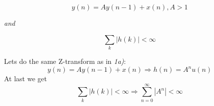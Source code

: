 \documentclass{article}
\begin{document}
\begin{enumerate}
\begin{enumerate}
            $$
            y(n) = Ay(n-1) + x(n), A > 1
            $$
            \begin{center}
                \textit{and}
            \end{center}
            $$
            \sum_k |h(k)| < \infty
            $$
            
            Lets do the same Z-transform as in \emph{1a)}:
            $$
            y(n) = Ay(n-1) + x(n) \Rightarrow h(n) = A^nu(n)
            $$
            At last we get
            $$
            \sum_k |h(k)| < \infty \Rightarrow \sum_{n=0}^{\infty}|A^n| < \infty
            $$
            
            
    \end{enumerate} 
\end{enumerate}
\end{document}
